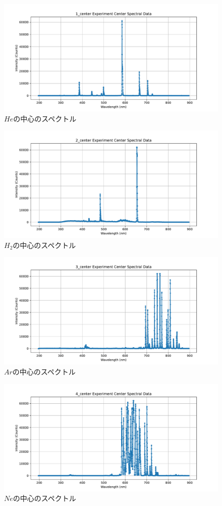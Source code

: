 \documentclass[a4j,twocolumn]{jsarticle}
\begin{document}
\begin{figure}[htb]
    \centering
    \includegraphics[keepaspectratio,width=0.6\columnwidth]{fig/1_center(He).pdf}
    \caption{$He$の中心のスペクトル}
\end{figure}
\begin{figure}[htb]
    \centering
    \includegraphics[keepaspectratio,width=0.6\columnwidth]{fig/2_center(H2).pdf}
    \caption{$H_2$の中心のスペクトル}
\end{figure}
\begin{figure}[htb]
    \centering
    \includegraphics[keepaspectratio,width=0.6\columnwidth]{fig/3_center(Ar).pdf}
    \caption{$Ar$の中心のスペクトル}
\end{figure}
\begin{figure}[htb]
    \centering
    \includegraphics[keepaspectratio,width=0.6\columnwidth]{fig/4_center(Ne).pdf}
    \caption{$Ne$の中心のスペクトル}
\end{figure}
\end{document}
